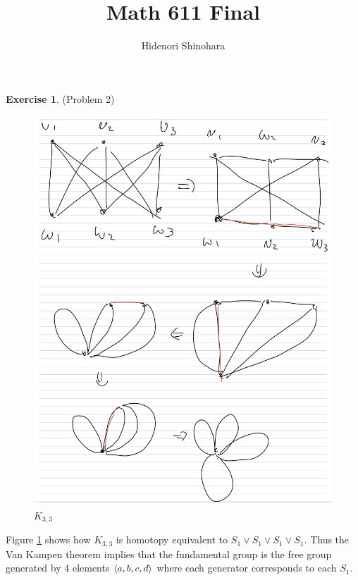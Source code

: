 \documentclass[12pt, psamsfonts]{amsart}
\theoremstyle{definition}
\newtheorem*{exer}{Exercise}
\theoremstyle{remark}
\numberwithin{equation}{section}
\begin{document}
\title{Math 611 Final}
\author{Hidenori Shinohara}
\maketitle

\begin{exer}{(Problem 2)}
 \begin{figure}
   \includegraphics[width=.5\linewidth]{k33.jpeg}
   \caption{$K_{3, 3}$}
   \label{fig:k33}
 \end{figure}
 Figure \ref{fig:k33} shows how $K_{3, 3}$ is homotopy equivalent to $S_1 \vee S_1 \vee S_1 \vee S_1$.
 Thus the Van Kampen theorem implies that the fundamental group is the free group generated by 4 elements $\ev{ a, b, c, d }$ where each generator corresponds to each $S_1$.
\end{exer}
\end{document}
